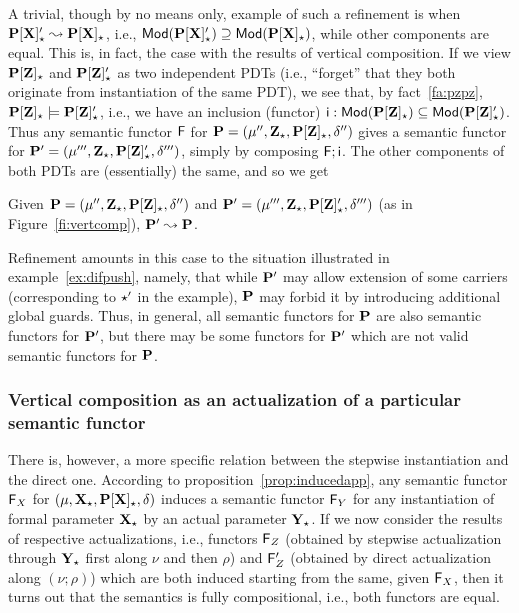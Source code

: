 A trivial, though by no means only, example of such a refinement is when
$\thr{P[X]'_\cons}\leadsto\thr{P[X]_\cons}$, i.e.,
$\Mod(\thr{P[X]'_\cons})\supseteq \Mod(\thr{P[X]_\cons})$, while other
components are equal. This is, in fact, the case with the results of vertical
composition. If we view $\thr{P[Z]_\cons}$ and $\thr{P[Z]'_\cons}$ as two
independent PDTs (i.e., ``forget'' that they both originate from instantiation
of the same PDT), we see that, 
by fact~\ref{fa:pzpz}, $\thr{P[Z]_\cons}\models
\thr{P[Z]'_\cons}$, i.e., we have an inclusion (functor)
$\fu i:\Mod(\thr{P[Z]_\cons})\subseteq\Mod(\thr{P[Z]'_\cons})$. 
Thus any semantic functor $\fu F$ for $\thr P= \pdtsp{\mu''}{\delta''}{\thr
Z_\cons}{\thr{P[Z]_\cons}}$ 
gives a semantic functor for $\thr P'= \pdtsp{\mu'''}{\delta'''}{\thr
Z_\cons}{\thr{P[Z]'_\cons}}$, simply 
by composing $\comp{\fu F}{\fu i}$.
The other components of both PDTs are (essentially) the same, and so we get
%
\begin{fact}
Given $\thr P= \pdtsp{\mu''}{\delta''}{\thr
Z_\cons}{\thr{P[Z]_\cons}}$ and  $\thr P'= \pdtsp{\mu'''}{\delta'''}{\thr
Z_\cons}{\thr{P[Z]'_\cons}}$ (as in Figure~\ref{fi:vertcomp}), $\thr P'\leadsto \thr P$.
\end{fact}
%
Refinement amounts in this case to the situation illustrated in
example~\ref{ex:difpush}, namely, that while $\thr P'$ may allow extension of
some carriers (corresponding to $\cons'$ in the example), $\thr P$ may forbid
it by introducing additional global guards. Thus, in general, all semantic
functors for $\thr P$ are also semantic functors for $\thr P'$, but there may
be some functors for $\thr P'$ which are not valid semantic functors for
$\thr P$.

\subsubsection{Vertical composition as an actualization of a particular semantic
functor}
There is, however, a more specific relation between the stepwise
instantiation and the direct one. According to
proposition~\ref{prop:inducedapp}, any semantic functor $\fu F_X$ for $\pdt$
induces a semantic functor $\fu F_Y$ for any instantiation of formal
parameter $\thr X_\cons$ by an actual parameter $\thr Y_\cons$. 
If we now consider the results of respective actualizations, i.e., functors
$\fu F_Z$ (obtained by stepwise actualization through $\thr Y_\cons$ first
along $\nu$ and then $\rho$) and
$\fu F'_Z$ (obtained by direct actualization along $(\nu;\rho)$) which are
both induced starting from the same, given $\fu F_X$, then it turns out that
the semantics is fully compositional, i.e., both functors are equal.


